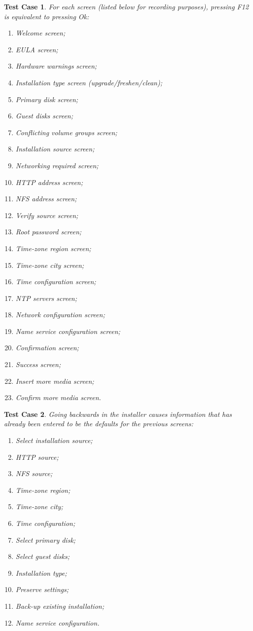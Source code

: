 \documentclass[a4paper]{article}
\newtheorem{testcase}{Test Case}
\begin{document}
\begin{testcase}
For each screen (listed below for recording purposes), pressing F12
is equivalent to pressing Ok:
\begin{enumerate}
\item Welcome screen;
\item EULA screen;
\item Hardware warnings screen;
\item Installation type screen (upgrade/freshen/clean);
\item Primary disk screen;
\item Guest disks screen;
\item Conflicting volume groups screen;
\item Installation source screen;
\item Networking required screen;
\item HTTP address screen;
\item NFS address screen;
\item Verify source screen;
\item Root password screen;
\item Time-zone region screen;
\item Time-zone city screen;
\item Time configuration screen;
\item NTP servers screen;
\item Network configuration screen;
\item Name service configuration screen;
\item Confirmation screen;
\item Success screen;
\item Insert more media screen;
\item Confirm more media screen.
\end{enumerate}
\end{testcase}

\begin{testcase}
Going backwards in the installer causes information that has already
been entered to be the defaults for the previous screens:
\begin{enumerate}
\item Select installation source;
\item HTTP source;
\item NFS source;
\item Time-zone region;
\item Time-zone city;
\item Time configuration;
\item Select primary disk;
\item Select guest disks;
\item Installation type;
\item Preserve settings;
\item Back-up existing installation;
\item Name service configuration.
\end{enumerate}
\end{testcase}
\end{document}
